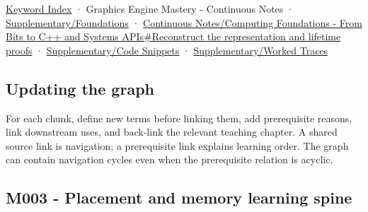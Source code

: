 \hyperref[appendix-a6d556a4ef50]{Keyword Index} · {Graphics Engine Mastery - Continuous Notes} · \hyperref[appendix-fd090d982a15]{Supplementary/Foundations} · \hyperref[01-foundations-i-ch010-reconstruct-the-representation-and-lifetime-proofs]{Continuous Notes/Computing Foundations - From Bits to C++ and Systems APIs\#Reconstruct the representation and lifetime proofs} · \hyperref[appendix-4e2236f53445]{Supplementary/Code Snippets} · \hyperref[appendix-92ff77d4dfdc]{Supplementary/Worked Traces}

\subsection{Updating the graph}\label{appendix-4ad47bdd269a-updating-the-graph}

For each chunk, define new terms before linking them, add prerequisite reasons, link downstream uses, and back-link the relevant teaching chapter. A shared source link is navigation; a prerequisite link explains learning order. The graph can contain navigation cycles even when the prerequisite relation is acyclic.

\subsection{M003 - Placement and memory learning spine}\label{appendix-4ad47bdd269a-m003---placement-and-memory-learning-spine}

